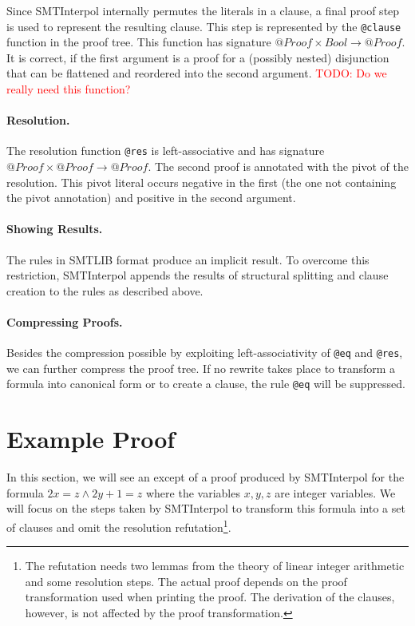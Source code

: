 \documentclass[a4paper]{article}
\newcommand\si{SMTInterpol\xspace}
\newcommand\todo[1]{\textcolor{red}{TODO: #1}}
\begin{document}
Since \si internally permutes the literals in a clause, a final proof step is
used to represent the resulting clause.
This step is represented by the \verb+@clause+
function in the proof tree.  This function has
signature $@Proof\times Bool\rightarrow@Proof$.
It is correct, if the first argument is a proof for a (possibly nested)
disjunction that can be flattened and reordered into the second argument.
\todo{Do we really need this function?}

\paragraph{Resolution.}  The resolution function \verb+@res+ is
left-associative and has signature $@Proof\times@Proof\rightarrow@Proof$.  The
second proof is annotated with the pivot of the resolution.  This pivot
literal occurs negative in the first (the one not containing the pivot
annotation) and positive in the second argument.

\paragraph{Showing Results.}  The rules in SMTLIB format produce an implicit
result.  To overcome this restriction, \si appends the results of structural
splitting and clause creation to the rules as described above.

\paragraph{Compressing Proofs.}  Besides the compression possible by
exploiting left-associativity of \verb+@eq+ and \verb+@res+, we can further
compress the proof tree.  If no rewrite takes place to transform a formula
into canonical form or to create a clause, the rule \verb+@eq+ will be
suppressed.

\section{Example Proof}
In this section, we will see an except of a proof produced by \si for the
formula $2x=z \land 2y + 1 = z$ where the variables $x,y,z$ are integer
variables.  We will focus on the steps taken by \si to transform this formula
into a set of clauses and omit the resolution refutation\footnote{The
  refutation needs two lemmas from the theory of linear integer arithmetic and
  some resolution steps.  The actual proof depends on the proof transformation
  used when printing the proof.  The derivation of the clauses, however, is
  not affected by the proof transformation.}.
\end{document}
